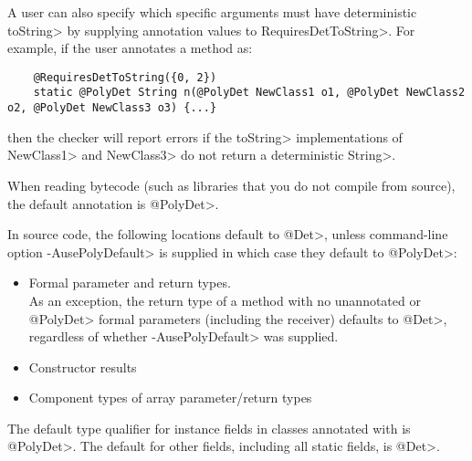 A user can also specify which specific arguments must have deterministic \<toString> by
supplying annotation values to \<RequiresDetToString>.
For example, if the user annotates a method as:
\begin{Verbatim}
    @RequiresDetToString({0, 2})
    static @PolyDet String n(@PolyDet NewClass1 o1, @PolyDet NewClass2 o2, @PolyDet NewClass3 o3) {...}
\end{Verbatim}
then the checker will report errors if the \<toString> implementations of \<NewClass1>
and \<NewClass3> do not return a deterministic \<String>.


When reading bytecode (such as libraries that you do not compile from
source), the default annotation is \<@PolyDet>.

In source code, the following locations default to
\<@Det>, unless command-line option \<-AusePolyDefault> is supplied in
which case they default to \<@PolyDet>:
\begin{itemize}
    \item Formal parameter and return types. \\
      As an exception, the return type of a method with no unannotated or
    \<@PolyDet> formal parameters (including the receiver) defaults to
    \<@Det>, regardless of whether \<-AusePolyDefault> was supplied.
    \item Constructor results
    \item Component types of array parameter/return types
\end{itemize}

The default type qualifier for instance fields in classes annotated with
 is \<@PolyDet>.
The default for other fields, including all static fields, is \<@Det>.


